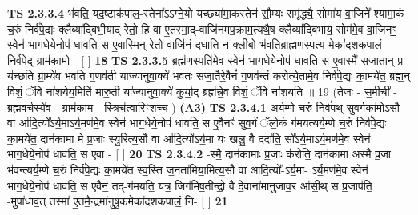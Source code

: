 \documentclass[17pt]{extarticle}
\begin{document}
                  \newline
                                \textbf{ TS 2.3.3.4} \newline
                  भ॑वति॒ यद॒ष्टाक॑पाल॒-स्तेना᳚ऽऽग्ने॒यो यच्छ्या॑मा॒कस्तेन॑ सौ॒म्यः समृ॑द्ध्यै॒ सोमा॑य वा॒जिने᳚ श्यामा॒कं च॒रुं निर्व॑पे॒द्यः क्लैब्या᳚द्बिभी॒याद् रेतो॒ हि वा ए॒तस्मा॒द्-वाजि॑नमप॒क्राम॒त्यथै॒ष क्लैब्या᳚द्बिभाय॒ सोम॑मे॒व वा॒जिनꣳ॒॒ स्वेन॑ भाग॒धेये॒नोप॑ धावति॒ स ए॒वास्मि॒न् रेतो॒ वाजि॑नं दधाति॒ न क्ली॒बो भ॑वतिब्राह्मणस्प॒त्य-मेका॑दशकपालं॒ निर्व॑पे॒द् ग्राम॑कामो॒ - [  ] \textbf{  18} \newline
                  \newline
                                \textbf{ TS 2.3.3.5} \newline
                  ब्रह्म॑ण॒स्पति॑मे॒व स्वेन॑ भाग॒धेये॒नोप॑ धावति॒ स ए॒वास्मै॑ सजा॒तान् प्र य॑च्छति ग्रा॒म्ये॑व भ॑वति ग॒णव॑ती याज्यानुवा॒क्ये॑ भवतः सजा॒तैरे॒वैनं॑ ग॒णव॑न्तं करोत्ये॒तामे॒व निर्व॑पे॒द्यः का॒मये॑त॒ ब्रह्म॒न् \textbf{ } \newline
                  \newline
                      विशं॒ ॅवि ना॑शयेय॒मिति॑ मारु॒ती या᳚ज्यानुवा॒क्ये॑ कुर्या॒द् ब्रह्म॑न्ने॒व विशं॒ ॅवि ना॑शयति ॥ 19 (तेजः॑ - स॒मीची᳚ - ब्रह्मवर्च॒स्ये॑व - ग्राम॑काम॒ - स्त्रिच॑त्वारिꣳशच्च )  \textbf{(A3)} \newline \newline
                                        \textbf{ TS 2.3.4.1} \newline
                  अ॒र्य॒म्णे च॒रुं निर्व॑पथ् सुव॒र्गका॑मो॒ऽसौ वा आ॑दि॒त्यो᳚ऽर्य॒माऽर्य॒मण॑मे॒व स्वेन॑ भाग॒धेये॒नोप॑ धावति॒ स ए॒वैनꣳ॑ सुव॒र्गं ॅलो॒कं ग॑मयत्यर्य॒म्णे च॒रुं निर्व॑पे॒द्यः का॒मये॑त॒ दान॑कामा मे प्र॒जाः स्यु॒रित्य॒सौ वा आ॑दि॒त्यो᳚ऽर्य॒मा यः खलु॒ वै ददा॑ति॒ सो᳚ऽर्य॒माऽर्य॒मण॑मे॒व स्वेन॑ भाग॒धेये॒नोप॑ धावति॒ स ए॒वा - [  ] \textbf{  20} \newline
                  \newline
                                \textbf{ TS 2.3.4.2} \newline
                  -स्मै॒ दान॑कामाः प्र॒जाः क॑रोति॒ दान॑कामा अस्मै प्र॒जा भ॑वन्त्यर्य॒म्णे च॒रुं निर्व॑पे॒द्यः का॒मये॑त स्व॒स्ति ज॒नता॑मिया॒मित्य॒सौ वा आ॑दि॒त्यो᳚-ऽर्य॒मा- ऽर्य॒मण॑मे॒व स्वेन॑ भाग॒धेये॒नोप॑ धावति॒ स ए॒वैनं॒ तद्-ग॑मयति॒ यत्र॒ जिग॑मिष॒तीन्द्रो॒ वै दे॒वाना॑मानुजाव॒र आ॑सी॒थ् स प्र॒जाप॑ति॒ -मुपा॑धाव॒त् तस्मा॑ ए॒तमै॒न्द्रमा॑नुषू॒कमेका॑दशकपालं॒ नि- [  ] \textbf{  21} \newline
                  \newline
\end{document}
